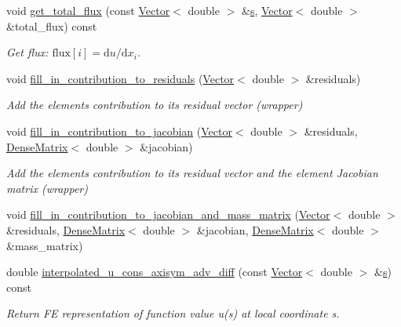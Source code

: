 \begin{DoxyCompactItemize}
void \hyperlink{namespaceoomph_a6bbeae059a0f06fc51b97fd76be99067}{get\+\_\+total\+\_\+flux} (const \hyperlink{classoomph_1_1Vector}{Vector}$<$ double $>$ \&\hyperlink{cfortran_8h_ab7123126e4885ef647dd9c6e3807a21c}{s}, \hyperlink{classoomph_1_1Vector}{Vector}$<$ double $>$ \&total\+\_\+flux) const
\begin{DoxyCompactList}\small\item\em Get flux\+: $\mbox{flux}[i] = \mbox{d}u / \mbox{d}x_i $. \end{DoxyCompactList}\item 
void \hyperlink{namespaceoomph_a4221193ecad909a3bf5cfcec81202e39}{fill\+\_\+in\+\_\+contribution\+\_\+to\+\_\+residuals} (\hyperlink{classoomph_1_1Vector}{Vector}$<$ double $>$ \&residuals)
\begin{DoxyCompactList}\small\item\em Add the element\textquotesingle{}s contribution to its residual vector (wrapper) \end{DoxyCompactList}\item 
void \hyperlink{namespaceoomph_a96a6d71e6bedf75a2fb9051be0644f98}{fill\+\_\+in\+\_\+contribution\+\_\+to\+\_\+jacobian} (\hyperlink{classoomph_1_1Vector}{Vector}$<$ double $>$ \&residuals, \hyperlink{classoomph_1_1DenseMatrix}{Dense\+Matrix}$<$ double $>$ \&jacobian)
\begin{DoxyCompactList}\small\item\em Add the element\textquotesingle{}s contribution to its residual vector and the element Jacobian matrix (wrapper) \end{DoxyCompactList}\item 
void \hyperlink{namespaceoomph_a2a572a47ad179fe5efba31f8f0a67244}{fill\+\_\+in\+\_\+contribution\+\_\+to\+\_\+jacobian\+\_\+and\+\_\+mass\+\_\+matrix} (\hyperlink{classoomph_1_1Vector}{Vector}$<$ double $>$ \&residuals, \hyperlink{classoomph_1_1DenseMatrix}{Dense\+Matrix}$<$ double $>$ \&jacobian, \hyperlink{classoomph_1_1DenseMatrix}{Dense\+Matrix}$<$ double $>$ \&mass\+\_\+matrix)
\item 
double \hyperlink{namespaceoomph_a24e114f1df46d56b50a57474d27e3dbb}{interpolated\+\_\+u\+\_\+cons\+\_\+axisym\+\_\+adv\+\_\+diff} (const \hyperlink{classoomph_1_1Vector}{Vector}$<$ double $>$ \&\hyperlink{cfortran_8h_ab7123126e4885ef647dd9c6e3807a21c}{s}) const
\begin{DoxyCompactList}\small\item\em Return FE representation of function value u(s) at local coordinate s. \end{DoxyCompactList}\item 

\end{DoxyCompactItemize}
